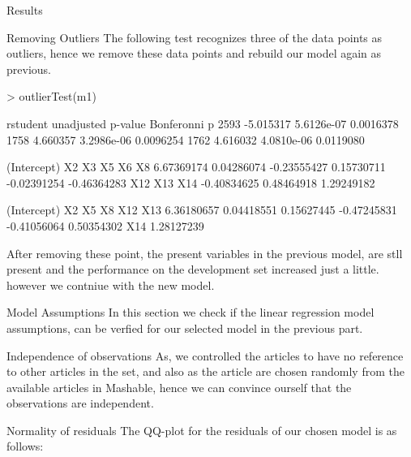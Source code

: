 \documentclass[a4paper,11pt]{article}
\begin{document}
\begin{section}{Results}
\begin{subsection}{Removing Outliers}
The following test recognizes three of the data points as outliers, hence we remove these data points and rebuild our model again as previous.
\begin{Schunk}
\begin{Sinput}
> outlierTest(m1)
\end{Sinput}
\begin{Soutput}
      rstudent unadjusted p-value Bonferonni p
2593 -5.015317         5.6126e-07    0.0016378
1758  4.660357         3.2986e-06    0.0096254
1762  4.616032         4.0810e-06    0.0119080
\end{Soutput}
\end{Schunk}
\begin{Schunk}
\begin{Soutput}
(Intercept)          X2          X3          X5          X6          X8 
 6.67369174  0.04286074 -0.23555427  0.15730711 -0.02391254 -0.46364283 
        X12         X13         X14 
-0.40834625  0.48464918  1.29249182 
\end{Soutput}
\begin{Soutput}
(Intercept)          X2          X5          X8         X12         X13 
 6.36180657  0.04418551  0.15627445 -0.47245831 -0.41056064  0.50354302 
        X14 
 1.28127239 
\end{Soutput}
\end{Schunk}

After removing these point, the present variables in the previous model, are stll present and the performance on the development set increased just a little. however we contniue with the new model.
\end{subsection}

\begin{subsection}{Model Assumptions}
In this section we check if the linear regression model assumptions, can be verfied for our selected model in the previous part.
\begin{subsubsection}{Independence of observations}
As, we controlled the articles to have no reference to other articles in the set, and also as the article are chosen randomly from the available articles in Mashable, hence we can convince ourself that the observations are independent.
\end{subsubsection}

\begin{subsubsection}{Normality of residuals}
The QQ-plot for the residuals of our chosen model is as follows:\\


\end{subsubsection}
\end{subsection}
\end{section}
\end{document}
